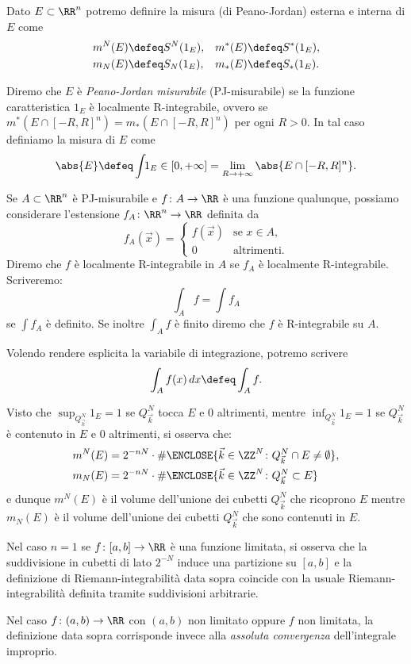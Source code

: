 \begin{definition}
Dato $E\subset \RR^n$ potremo definire la misura (di Peano-Jordan) esterna 
e interna di $E$ come 
\begin{align*}
 m^N(E) &\defeq S^N(1_E), & m^*(E) &\defeq S^*(1_E),\\
 m_N(E) &\defeq S_N(1_E), & m_*(E) &\defeq S_*(1_E).
\end{align*}

Diremo che $E$ è \emph{Peano-Jordan misurabile} 
(PJ-misurabile) se la funzione caratteristica $1_E$ è localmente 
R-integrabile,
ovvero se $m^*(E\cap[-R,R]^n) = m_*(E\cap[-R,R]^n)$ per ogni $R>0$.
In tal caso definiamo la misura di $E$ come 
\[
\abs{E} \defeq \int\!\! 1_E \in [0,+\infty] = \lim_{R\to+\infty} \abs{E\cap[-R,R]^n}.
\]


Se $A\subset \RR^n$ è PJ-misurabile e $f\colon A \to \RR$
è una funzione qualunque, possiamo considerare l'estensione 
$f_A\colon \RR^n \to \RR$ definita da 
\[
 f_A(\vec x) = \begin{cases}
    f(\vec x) & \text{se $x\in A$,}\\
    0 & \text{altrimenti.}
 \end{cases}
\]
Diremo che $f$ è localmente R-integrabile in $A$ se $f_A$ 
è localmente R-integrabile. 
Scriveremo:
\[
 \int_A f = \int\!\! f_A
\]
se $\int f_A$ è definito.
Se inoltre $\int_A f$ è finito diremo che $f$ è R-integrabile
su $A$.

Volendo rendere esplicita la variabile di integrazione, potremo 
scrivere 
\[
  \int_A f(x)\, dx \defeq \int_A f.
\]
\end{definition}

\begin{remark}
Visto che $\sup_{Q^N_{\vec k}} 1_E = 1$ se $Q^N_{\vec k}$ tocca $E$ e $0$ altrimenti,
mentre $\inf_{Q^N_{\vec k}} 1_E = 1$ se $Q^N_{\vec k}$ è contenuto in $E$
e $0$ altrimenti,
si osserva che:
\begin{align*}
 m^N(E) &= 2^{-nN} \cdot \# \ENCLOSE{\vec k\in \ZZ^N\colon Q_{\vec k}^N \cap E \neq \emptyset},\\
  m_N(E) &= 2^{-nN} \cdot \# \ENCLOSE{\vec k\in \ZZ^N\colon Q_{\vec k}^N \subset E}
\end{align*}
e dunque $m^N(E)$ è il volume dell'unione dei cubetti $Q^N_{\vec k}$ che ricoprono $E$ 
mentre $m_N(E)$ è il volume dell'unione dei cubetti $Q^N_{\vec k}$ che sono contenuti in $E$.
\end{remark}

\begin{remark}[caso $n=1$]
Nel caso $n=1$ se $f\colon [a,b]\to \RR$ è una funzione limitata,
si osserva che la suddivisione in cubetti di lato $2^{-N}$ induce una partizione 
su $[a,b]$ e la definizione di Riemann-integrabilità data sopra coincide con la 
usuale Riemann-integrabilità definita tramite suddivisioni arbitrarie.

Nel caso $f\colon(a,b)\to \RR$ con $(a,b)$ non limitato oppure $f$ non limitata,
la definizione data sopra corrisponde invece alla \emph{assoluta convergenza} 
dell'integrale improprio.
\end{remark}


